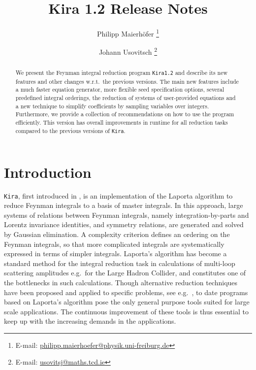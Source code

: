 \documentclass[a4paper,12pt]{article}
\title{Kira 1.2 Release Notes}
\author[,a]{Philipp Maierh\"ofer%
  \footnote{E-mail: \href{mailto:philipp.maierhoefer@physik.uni-freiburg.de}{%
                          philipp.maierhoefer@physik.uni-freiburg.de}}}
\author[,b]{Johann Usovitsch%
  \footnote{E-mail: \href{mailto:usovitsj@maths.tcd.ie}{usovitsj@maths.tcd.ie}}}
\affil[a]{Physikalisches Institut, Albert-Ludwigs-Universit\"at Freiburg,
          79104~Freiburg, Germany}
\affil[b]{Trinity College Dublin, School of Mathematics, Dublin 2, Ireland}
\date{}
\renewcommand{\headheight}{28pt}
\newcommand*{\kira}{\texttt{Kira}}
\begin{document}

\maketitle
\thispagestyle{firstpage}

\begin{abstract}
  We present the Feynman integral reduction program \kira{}\;\texttt{1.2} and
  describe its new features and other changes w.r.t.\ the previous versions.
  The main new features include a much faster equation generator, more flexible
  seed specification options, several predefined integral orderings, the
  reduction of systems of user-provided equations and a new technique to
  simplify coefficients by sampling variables over integers.
  Furthermore, we provide a collection of recommendations on how to use the
  program efficiently.
  This version has overall improvements in runtime for all reduction tasks
  compared to the previous versions of \kira{}.
\end{abstract}

\clearpage
\renewcommand{\headheight}{0pt}


\section{Introduction}

\kira{}, first introduced in \cite{Maierhoefer:2017hyi}, is an implementation of
the Laporta algorithm \cite{Laporta:2001dd} to reduce Feynman integrals to a
basis of master integrals.
In this approach, large systems of relations between Feynman integrals, namely
integration-by-parts \cite{Chetyrkin:1981qh} and Lorentz invariance
\cite{Gehrmann:1999as} identities, and symmetry relations, are generated and
solved by Gaussian elimination.
A complexity criterion defines an ordering on the Feynman integrals, so that
more complicated integrals are systematically expressed in terms of simpler
integrals.
Laporta's algorithm has become a standard method for the integral reduction task
in calculations of multi-loop scattering amplitudes e.g.\ for the Large Hadron
Collider, and constitutes one of the bottlenecks in such calculations.
Though alternative reduction techniques have been proposed and applied to
specific problems, see
e.g.\ \cite{Smirnov:2005ky,Lee:2013mka,Larsen:2015ped,Kosower:2018obg}, to date
programs based on Laporta's algorithm
\cite{Anastasiou:2004vj,vonManteuffel:2012np,Smirnov:2014hma} pose the only
general purpose tools suited for large scale applications.
The continuous improvement of these tools is thus essential to keep up with the
increasing demands in the applications.
\end{document}
